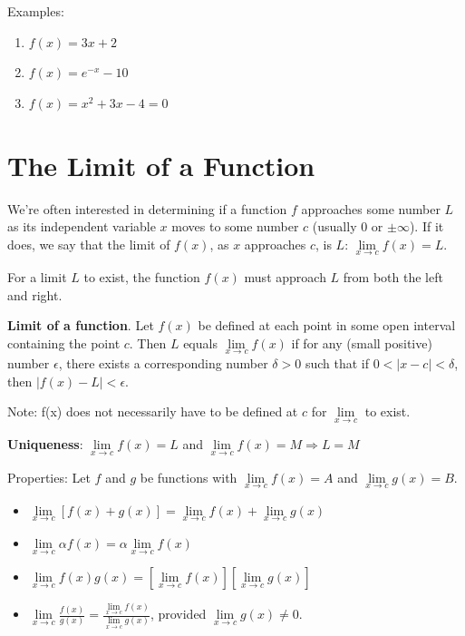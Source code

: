 \documentclass[]{book}
\providecommand{\tightlist}{%
  \setlength{\itemsep}{0pt}\setlength{\parskip}{0pt}}
\theoremstyle{definition}
\theoremstyle{definition}
\theoremstyle{definition}
\theoremstyle{remark}
\begin{document}
Examples:

\begin{enumerate}
        \item $f(x)=3x+2$ \\
        \item $f(x)=e^{-x}-10$ \\
        \item $f(x)=x^2+3x-4=0$  \\
\end{enumerate}

\section{The Limit of a Function}\label{the-limit-of-a-function}

We're often interested in determining if a function \(f\) approaches
some number \(L\) as its independent variable \(x\) moves to some number
\(c\) (usually 0 or \(\pm\infty\)). If it does, we say that the limit of
\(f(x)\), as \(x\) approaches \(c\), is \(L\):
\(\lim\limits_{x \to c} f(x)=L\).

For a limit \(L\) to exist, the function \(f(x)\) must approach \(L\)
from both the left and right.

\textbf{Limit of a function}. Let \(f(x)\) be defined at each point in
some open interval containing the point \(c\). Then \(L\) equals
\(\lim\limits_{x \to c} f(x)\) if for any (small positive) number
\(\epsilon\), there exists a corresponding number \(\delta>0\) such that
if \(0<|x-c|<\delta\), then \(|f(x)-L|<\epsilon\).

Note: f(x) does not necessarily have to be defined at \(c\) for
\(\lim\limits_{x \to c}\) to exist.

\textbf{Uniqueness}: \(\lim\limits_{x \to c} f(x)=L\) and
\(\lim\limits_{x \to c} f(x)=M \Longrightarrow L=M\)

Properties: Let \(f\) and \(g\) be functions with
\(\lim\limits_{x \to c} f(x)=A\) and \(\lim\limits_{x \to c} g(x)=B\).

\begin{itemize}
\tightlist
\item
  \(\lim\limits_{x \to c}[f(x)+g(x)]=\lim\limits_{x \to c} f(x)+ \lim\limits_{x \to c} g(x)\)
\item
  \(\lim\limits_{x \to c} \alpha f(x) = \alpha \lim\limits_{x \to c} f(x)\)
\item
  \(\lim\limits_{x \to c} f(x) g(x) = [\lim\limits_{x \to c} f(x)][\lim\limits_{x \to c} g(x)]\)
\item
  \(\lim\limits_{x \to c} \frac{f(x)}{g(x)} = \frac{\lim\limits_{x \to c} f(x)}{\lim\limits_{x \to c} g(x)}\),
  provided \(\lim\limits_{x \to c} g(x)\ne 0\).
\end{itemize}
\end{document}

